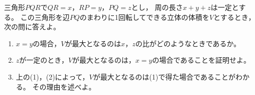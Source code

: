 \begin{problem}
  三角形$PQR$で$QR=x$，$RP=y$，$PQ=z$とし，
周の長さ$x+y+z$は一定とする。
この三角形を辺$PQ$のまわりに1回転してできる立体の体積を$V$とするとき，
次の問に答えよ。
\begin{enumerate}
\item $x=y$の場合，$V$が最大となるのは$x$，$z$の比がどのようなときであるか。
\item $z$が一定のとき，$V$が最大となるのは，$x=y$の場合であることを証明せよ。
\item 上の(1)，(2)によって，$V$が最大となるのは(1)で得た場合であることがわかる。
その理由を述べよ。
\end{enumerate}
\end{problem}

